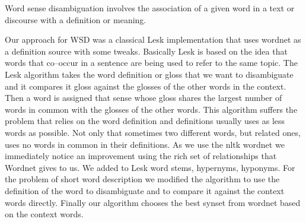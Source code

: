 Word sense disambiguation involves the association of a given word in a text or discourse with a definition or meaning.

Our approach for WSD was a classical Lesk\cite{LESK} implementation that uses wordnet as a definition source with some tweaks.
Basically Lesk is based on the idea that words that co–occur in a sentence are being used to refer to the same topic.
The Lesk algorithm takes the word definition or gloss that we want to disambiguate and it compares it gloss against the glosses of the other words in the context.
Then a word is assigned that sense whose gloss shares the largest number of words in common with the glosses of the other words.
This algorithm suffers the problem that relies on the word definition and definitions usually uses as less words as possible.
Not only that sometimes two different words, but related ones, uses no words in common in their definitions.
As we use the nltk wordnet we immediately notice an improvement using the rich set of relationships that Wordnet gives to us.
We added to Lesk word stems, hypernyms, hyponyms.
For the problem of short word description we modified the algorithm to use the definition of the word to disambiguate and to compare it against the context words directly.
Finally our algorithm chooses the best synset from wordnet based on the context words.
